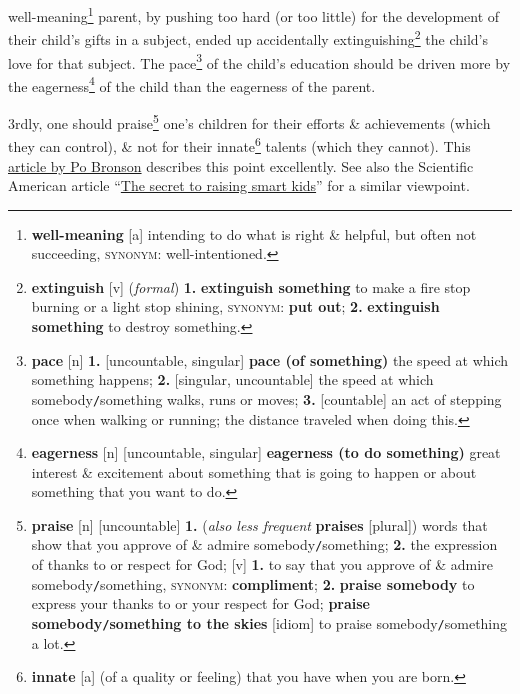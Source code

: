 \documentclass{article}
\numberwithin{equation}{section}
\begin{document}
well-meaning\footnote{\textbf{well-meaning} [a] intending to do what is right \& helpful, but often not succeeding, \textsc{synonym}: well-intentioned.} parent, by pushing too hard (or too little) for the development of their child's gifts in a subject, ended up accidentally extinguishing\footnote{\textbf{extinguish} [v] (\textit{formal}) \textbf{1.} \textbf{extinguish something} to make a fire stop burning or a light stop shining, \textsc{synonym}: \textbf{put out}; \textbf{2.} \textbf{extinguish something} to destroy something.} the child's love for that subject. The pace\footnote{\textbf{pace} [n] \textbf{1.} [uncountable, singular] \textbf{pace (of something)} the speed at which something happens; \textbf{2.} [singular, uncountable] the speed at which somebody\texttt{/}something walks, runs or moves; \textbf{3.} [countable] an act of stepping once when walking or running; the distance traveled when doing this.} of the child's education should be driven more by the eagerness\footnote{\textbf{eagerness} [n] [uncountable, singular] \textbf{eagerness (to do something)} great interest \& excitement about something that is going to happen or about something that you want to do.} of the child than the eagerness of the parent.

3rdly, one should praise\footnote{\textbf{praise} [n] [uncountable] \textbf{1.} (\textit{also less frequent} \textbf{praises} [plural]) words that show that you approve of \& admire somebody\texttt{/}something; \textbf{2.} the expression of thanks to or respect for God; [v] \textbf{1.} to say that you approve of \& admire somebody\texttt{/}something, \textsc{synonym}: \textbf{compliment}; \textbf{2.} \textbf{praise somebody} to express your thanks to or your respect for God; \textbf{praise somebody\texttt{/}something to the skies} [idiom] to praise somebody\texttt{/}something a lot.} one's children for their efforts \& achievements (which they can control), \& not for their innate\footnote{\textbf{innate} [a] (of a quality or feeling) that you have when you are born.} talents (which they cannot). This \href{http://nymag.com/news/features/27840/}{article by Po Bronson} describes this point excellently. See also the Scientific American article ``\href{http://www.sciam.com/article.cfm?id=the-secret-to-raising-smart-kids}{The secret to raising smart kids}'' for a similar viewpoint.
\end{document}
